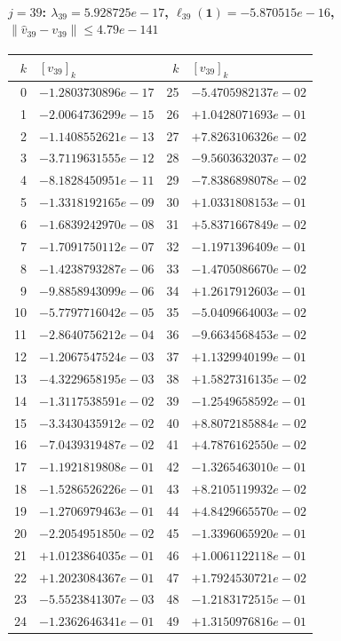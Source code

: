 \documentclass[11pt]{article}
\begin{document}
\paragraph{$j = 39$: $\lambda_{39} = 5.928725e-17$, \quad $\ell_{39}(\mathbf{1}) = -5.870515e-16$, \quad $\|\hat v_{39} - v_{39}\| \leq 4.79e-141$}
\begin{center}
{\footnotesize
\begin{tabular}{r@{\;\;}l@{\quad}r@{\;\;}l}
\toprule
$k$ & $[v_{39}]_k$ & $k$ & $[v_{39}]_k$ \\
\midrule
0 & $-1.2803730896e-17$ & 25 & $-5.4705982137e-02$ \\
1 & $-2.0064736299e-15$ & 26 & $+1.0428071693e-01$ \\
2 & $-1.1408552621e-13$ & 27 & $+7.8263106326e-02$ \\
3 & $-3.7119631555e-12$ & 28 & $-9.5603632037e-02$ \\
4 & $-8.1828450951e-11$ & 29 & $-7.8386898078e-02$ \\
5 & $-1.3318192165e-09$ & 30 & $+1.0331808153e-01$ \\
6 & $-1.6839242970e-08$ & 31 & $+5.8371667849e-02$ \\
7 & $-1.7091750112e-07$ & 32 & $-1.1971396409e-01$ \\
8 & $-1.4238793287e-06$ & 33 & $-1.4705086670e-02$ \\
9 & $-9.8858943099e-06$ & 34 & $+1.2617912603e-01$ \\
10 & $-5.7797716042e-05$ & 35 & $-5.0409664003e-02$ \\
11 & $-2.8640756212e-04$ & 36 & $-9.6634568453e-02$ \\
12 & $-1.2067547524e-03$ & 37 & $+1.1329940199e-01$ \\
13 & $-4.3229658195e-03$ & 38 & $+1.5827316135e-02$ \\
14 & $-1.3117538591e-02$ & 39 & $-1.2549658592e-01$ \\
15 & $-3.3430435912e-02$ & 40 & $+8.8072185884e-02$ \\
16 & $-7.0439319487e-02$ & 41 & $+4.7876162550e-02$ \\
17 & $-1.1921819808e-01$ & 42 & $-1.3265463010e-01$ \\
18 & $-1.5286526226e-01$ & 43 & $+8.2105119932e-02$ \\
19 & $-1.2706979463e-01$ & 44 & $+4.8429665570e-02$ \\
20 & $-2.2054951850e-02$ & 45 & $-1.3396065920e-01$ \\
21 & $+1.0123864035e-01$ & 46 & $+1.0061122118e-01$ \\
22 & $+1.2023084367e-01$ & 47 & $+1.7924530721e-02$ \\
23 & $-5.5523841307e-03$ & 48 & $-1.2183172515e-01$ \\
24 & $-1.2362646341e-01$ & 49 & $+1.3150976816e-01$ \\
\bottomrule
\end{tabular}
}
\end{center}
\end{document}
